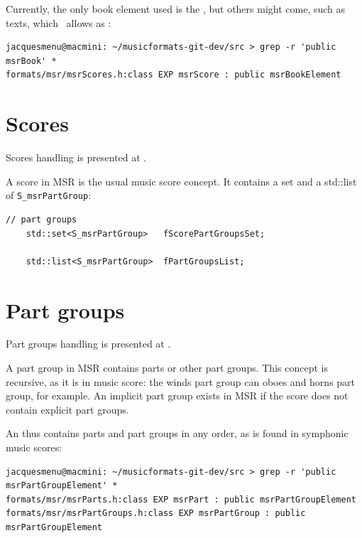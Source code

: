 Currently, the only book element used is the , but others might come, such as texts, which \lily\ allows as :
\begin{lstlisting}[language=Terminal]
jacquesmenu@macmini: ~/musicformats-git-dev/src > grep -r 'public msrBook' *
formats/msr/msrScores.h:class EXP msrScore : public msrBookElement
\end{lstlisting}


\section{Scores}\label{Scores}

Scores handling is presented at .

A score in MSR is the usual music score concept. It contains a set and a std::list of {\tt S_msrPartGroup}:
\begin{lstlisting}[language=CPlusPlus]
    // part groups
    std::set<S_msrPartGroup>   fScorePartGroupsSet;

    std::list<S_msrPartGroup>  fPartGroupsList;
\end{lstlisting}


\section{Part groups}\label{Part groups}

Part groups handling is presented at .

A part group in MSR contains parts or other part groups. This concept is recursive, as it is in music score: the winds part group can oboes and horns part group, for example.
An implicit part group exists in MSR if the score does not contain explicit part groups.

An  thus contains parts and part groups in any order, as is found in symphonic music scores:
\begin{lstlisting}[language=Terminal]
jacquesmenu@macmini: ~/musicformats-git-dev/src > grep -r 'public msrPartGroupElement' *
formats/msr/msrParts.h:class EXP msrPart : public msrPartGroupElement
formats/msr/msrPartGroups.h:class EXP msrPartGroup : public msrPartGroupElement
\end{lstlisting}

